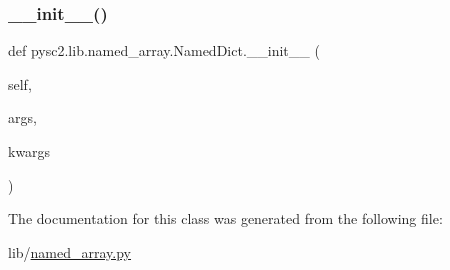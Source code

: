 \subsubsection{\texorpdfstring{\+\_\+\+\_\+init\+\_\+\+\_\+()}{\_\_init\_\_()}}
{\footnotesize\ttfamily def pysc2.\+lib.\+named\+\_\+array.\+Named\+Dict.\+\_\+\+\_\+init\+\_\+\+\_\+ (\begin{DoxyParamCaption}\item[{}]{self,  }\item[{}]{args,  }\item[{}]{kwargs }\end{DoxyParamCaption})}



The documentation for this class was generated from the following file\+:\begin{DoxyCompactItemize}
\item 
lib/\mbox{\hyperlink{named__array_8py}{named\+\_\+array.\+py}}\end{DoxyCompactItemize}
